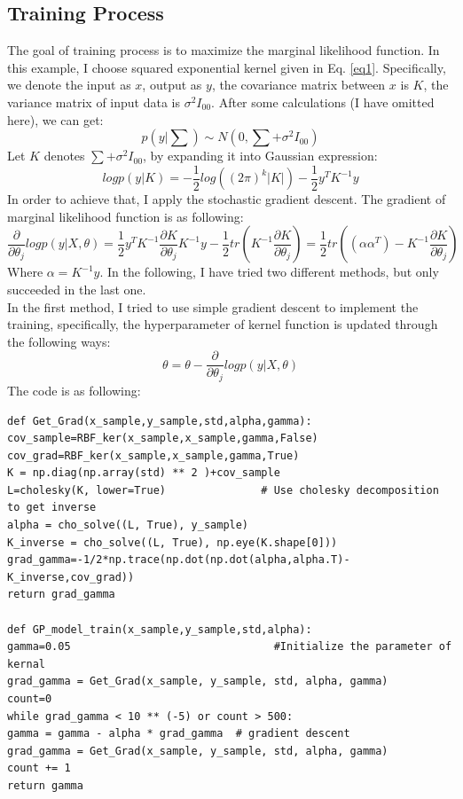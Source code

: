 \documentclass{article} %
\begin{document}
\subsection{Training Process}
The goal of training process is to maximize the marginal likelihood function. In this example, I choose squared exponential kernel given in Eq. \ref{eq1}. Specifically, we denote the input as $x$, output as $y$, the covariance matrix between $x$ is $K$, the variance matrix of input data is $\sigma^2I_{00}$. After some calculations (I have omitted here), we can get:
\begin{equation}
p({y|\sum})\sim N(0,\sum+\sigma^2I_{00})
\end{equation}
Let $K$ denotes $\sum+\sigma^2I_{00}$, by expanding it into Gaussian expression:
\begin{equation}
logp({y|K})=-\frac{1}{2}log((2\pi)^k|K|)-\frac{1}{2}y^T{K}^{-1}y
\end{equation}
In order to achieve that, I apply the stochastic gradient descent. The gradient of marginal likelihood function is as following:
\begin{equation}
\frac{\partial}{\partial \theta_j}logp(y|X,\theta)=\frac{1}{2}y^{T}K^{-1}\frac{\partial K}{\partial \theta_j}K^{-1}y-\frac{1}{2}tr(K^{-1}\frac{\partial K}{\partial \theta_j})
=\frac{1}{2}tr((\alpha\alpha^T)-K^{-1}\frac{\partial K}{\partial \theta_j})
\end{equation}
Where $\alpha=K^{-1}y$. In the following, I have tried two different methods, but only succeeded in the last one. \\
In the first method, I tried to use simple gradient descent to implement the training, specifically, the hyperparameter of kernel function is updated through the following ways: 
\begin{equation}
\theta=\theta-\frac{\partial}{\partial \theta_j}logp(y|X,\theta)
\end{equation}
The code is as following:
\begin{lstlisting}
def Get_Grad(x_sample,y_sample,std,alpha,gamma):
cov_sample=RBF_ker(x_sample,x_sample,gamma,False)
cov_grad=RBF_ker(x_sample,x_sample,gamma,True)
K = np.diag(np.array(std) ** 2 )+cov_sample
L=cholesky(K, lower=True)               # Use cholesky decomposition to get inverse
alpha = cho_solve((L, True), y_sample)
K_inverse = cho_solve((L, True), np.eye(K.shape[0]))
grad_gamma=-1/2*np.trace(np.dot(np.dot(alpha,alpha.T)-K_inverse,cov_grad))
return grad_gamma

def GP_model_train(x_sample,y_sample,std,alpha):
gamma=0.05                                #Initialize the parameter of kernal
grad_gamma = Get_Grad(x_sample, y_sample, std, alpha, gamma)
count=0
while grad_gamma < 10 ** (-5) or count > 500:
gamma = gamma - alpha * grad_gamma  # gradient descent
grad_gamma = Get_Grad(x_sample, y_sample, std, alpha, gamma)
count += 1
return gamma
\end{lstlisting}
\end{document}
